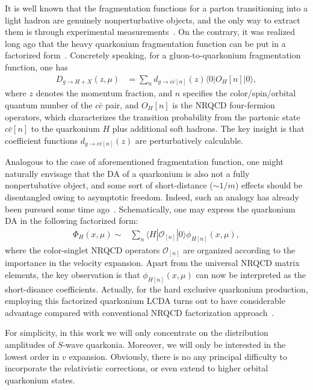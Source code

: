\documentclass[english,preprint,aps,prd,showpacs,superscriptaddress,nofootinbib,tightenlines]{revtex4}
\begin{document}
It is well known that the fragmentation functions for a parton transitioning into a light hadron
are genuinely nonperturbative
objects, and the only way to extract them is through experimental measurements~\cite{Agashe:2014kda}.
On the contrary, it was realized long ago that the heavy quarkonium fragmentation function can be
put in a factorized form~\cite{Braaten:1993mp,Braaten:1993rw}.
Concretely speaking, for a gluon-to-quarkonium fragmentation function, one has
\begin{align}
D_{g\to H+X}(z,\mu) &= \sum_n  d_{g\to c\bar{c}[n]}(z) \langle 0| O_H[n] |0\rangle,
\end{align}
where $z$ denotes the momentum fraction, and $n$ specifies the color/spin/orbital quantum number of the $c\bar{c}$ pair, and
$O_H[n]$ is the NRQCD four-fermion operators, which characterizes the transition probability from the
partonic state $c\bar{c}[n]$ to the quarkonium $H$ plus additional soft hadrons.
The key insight is that coefficient functions $d_{g\to c\bar{c}[n]}(z)$ are perturbatively calculable.

Analogous to the case of aforementioned fragmentation function,
one might naturally envisage that the DA of a quarkonium is also not a fully nonpertubative object,
and some sort of short-distance ($\sim 1/m$) effects should be disentangled owing to asymptotic freedom.
Indeed, such an analogy has already been pursued some time ago~\cite{Ma:2006hc,Bell:2008er}.
Schematically, one may express the quarkonium DA in the following factorized form:
\begin{align}
\Phi_{H}(x,\mu) \sim & \sum_{n} \langle H\left| \mathcal{O}_{[n]}\right|0\rangle
\phi_{H[n]}(x,\mu),
\label{eq:ReFact}
\end{align}
where the color-singlet NRQCD operators $\mathcal{O}_{[n]}$ are
organized according to the importance in the velocity expansion. Apart from the universal NRQCD matrix elements,
the key observation is that $\phi_{H[n]}\left(x,\mu\right)$ can now be interpreted as the short-disance coefficients.
Actually, for the hard exclusive quarkonium production, employing this factorized quarkonium LCDA turns out to
have considerable advantage compared with conventional NRQCD factorization approach~\cite{Jia:2008ep,Jia:2010fw}.

For simplicity, in this work we will only concentrate on the distribution amplitudes of $S$-wave quarkonia. Moreover,
we will only be interested in the lowest order in $v$ expansion.
Obviously, there is no any principal difficulty to incorporate the relativistic corrections,
or even extend to higher orbital quarkonium states.
\end{document}
